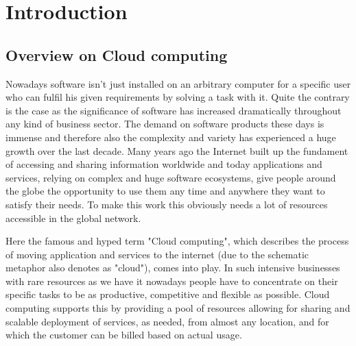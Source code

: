 \chapter{Introduction}
\label{chap:introduction}

\section{Overview on Cloud computing}

Nowadays software isn't just installed on an arbitrary computer for a specific user who can fulfil his given requirements by solving a task with it. Quite the contrary is the case as the significance of software has increased dramatically throughout any kind of business sector. The demand on software products these days is immense and therefore also the complexity and variety has experienced a huge growth over the last decade. Many years ago the Internet built up the fundament of accessing and sharing information worldwide and today applications and services, relying on complex and huge software ecosystems, give people around the globe the opportunity to use them any time and anywhere they want to satisfy their needs. To make this work this obviously needs a lot of resources accessible in the global network. 

Here the famous and hyped term "Cloud computing", which describes the process of moving application and services to the internet (due to the schematic metaphor also denotes as "cloud"), comes into play. \cite{Dialogic_Corporation} In such intensive businesses with rare resources as we have it nowadays people have to concentrate on their specific tasks to be as productive, competitive and flexible as possible. Cloud computing supports this by providing a pool of resources allowing for sharing and scalable deployment of services, as needed, from almost any location, and for which the customer can be billed based on actual usage. \cite{Dialogic_Corporation}

